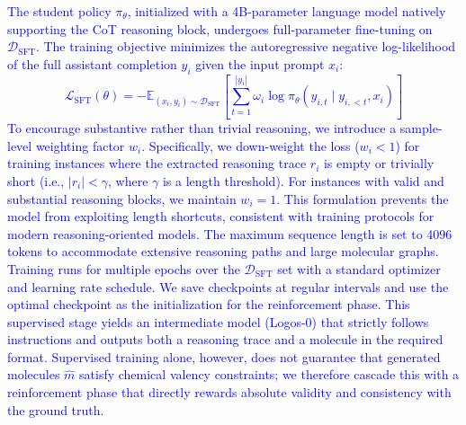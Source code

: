\documentclass[11pt]{article}
\begin{document}
\textcolor{blue}{The student policy $\pi_\theta$, initialized with a 4B-parameter language model natively supporting the CoT reasoning block, undergoes full-parameter fine-tuning on $\mathcal{D}_{\text{SFT}}$. The training objective minimizes the autoregressive negative log-likelihood of the full assistant completion $y_i$ given the input prompt $x_i$:
\begin{equation}
\mathcal{L}_{\text{SFT}}(\theta) = - \mathbb{E}_{(x_i, y_i) \sim \mathcal{D}_{\text{SFT}}} \left[ \sum_{t=1}^{|y_i|} \omega_i \log \pi_\theta(y_{i,t} \mid y_{i,<t}, x_i) \right]
\label{eq:sft_loss}
\end{equation}
To encourage substantive rather than trivial reasoning, we introduce a sample-level weighting factor $w_i$. Specifically, we down-weight the loss ($w_i < 1$) for training instances where the extracted reasoning trace $r_i$ is empty or trivially short (i.e., $|r_i| < \gamma$, where $\gamma$ is a length threshold). For instances with valid and substantial reasoning blocks, we maintain $w_i = 1$. This formulation prevents the model from exploiting length shortcuts, consistent with training protocols for modern reasoning-oriented models. The maximum sequence length is set to 4096 tokens to accommodate extensive reasoning paths and large molecular graphs. Training runs for multiple epochs over the $\mathcal{D}_{\text{SFT}}$ set with a standard optimizer and learning rate schedule. We save checkpoints at regular intervals and use the optimal checkpoint as the initialization for the reinforcement phase. This supervised stage yields an intermediate model (Logos-0) that strictly follows instructions and outputs both a reasoning trace and a molecule in the required format. Supervised training alone, however, does not guarantee that generated molecules $\hat{m}$ satisfy chemical valency constraints; we therefore cascade this with a reinforcement phase that directly rewards absolute validity and consistency with the ground truth.}
\end{document}
